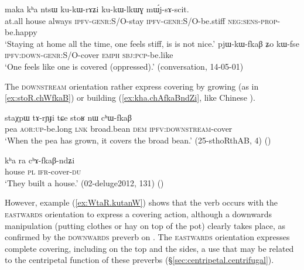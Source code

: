 \begin{exe}
\ex 
\begin{xlist}
\ex 
\gll maka kʰa ntsɯ ku-kɯ-rɤʑi ku-kɯ-lkɯɣ mɯ́j-sɤ-scit. \\
at.all house always \textsc{ipfv}-\textsc{genr}:S/O-stay \textsc{ipfv}-\textsc{genr}:S/O-be.stiff \textsc{neg}:\textsc{sens}-\textsc{prop}-be.happy \\
\glt `Staying at home all the time, one feels stiff, is is not nice.'
\ex \label{ex:pjWkWfkaB}
\gll pjɯ-kɯ-fkaβ ʑo kɯ-fse \\
\textsc{ipfv}:\textsc{down}-\textsc{genr}:S/O-cover \textsc{emph} \textsc{sbj}:\textsc{pcp}-be.like \\
\glt `One feels like one is covered (oppressed).' (conversation, 14-05-01)
\end{xlist}
\end{exe}

The \textsc{downstream} orientation rather express covering by growing (as in \ref{ex:stoR.chWfkaB}) or building (\ref{ex:kha.chAfkaBndZi}, like Chinese ).

\begin{exe}
\ex \label{ex:stoR.chWfkaB}
\gll staχpɯ tɤ-rɲɟi tɕe stoʁ nɯ cʰɯ-fkaβ\\
pea \textsc{aor}:\textsc{up}-be.long \textsc{lnk} broad.bean \textsc{dem} \textsc{ipfv}:\textsc{downstream}-cover\\
\glt `When the pea has grown, it covers the broad bean.' (25-sthoRthAB, 4)
()
\end{exe}

\begin{exe}
\ex \label{ex:kha.chAfkaBndZi}
\gll kʰa ra cʰɤ-fkaβ-ndʑi  \\
house \textsc{pl} \textsc{ifr}-cover-\textsc{du}   \\
\glt `They built a house.' (02-deluge2012, 131) ()
\end{exe}

However, example (\ref{ex:WtaR.kutanW}) shows that the verb  occurs with the \textsc{eastwards} orientation to express a covering action, although a downwards manipulation (putting clothes or hay on top of the pot) clearly takes place, as confirmed by the \textsc{downwards} preverb on . The \textsc{eastwards} orientation expresses complete covering, including on the top and the sides, a use that may be related to the centripetal function of these preverbs (§\ref{sec:centripetal.centrifugal}). 

